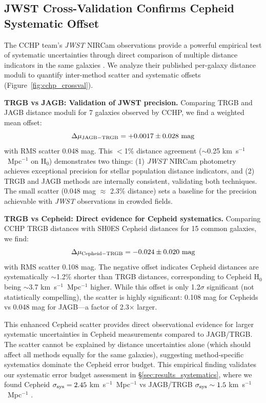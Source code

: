 \documentclass[twocolumn, linenumbers]{aastex701}
\begin{document}
\subsection{JWST Cross-Validation Confirms Cepheid Systematic Offset}
\label{sec:results_jwst}

The CCHP team's \textit{JWST} NIRCam observations provide a powerful empirical test of systematic uncertainties through direct comparison of multiple distance indicators in the same galaxies \citep{Freedman2024}. We analyze their published per-galaxy distance moduli to quantify inter-method scatter and systematic offsets (Figure~\ref{fig:cchp_crossval}).

\textbf{TRGB vs JAGB: Validation of JWST precision.} Comparing TRGB and JAGB distance moduli for 7 galaxies observed by CCHP, we find a weighted mean offset:
\begin{equation}
\Delta\mu_{\rm JAGB-TRGB} = +0.0017 \pm 0.028~{\rm mag}
\end{equation}
with RMS scatter 0.048 mag. This $<$1\% distance agreement ($\sim$0.25 km~s$^{-1}$~Mpc$^{-1}$ on H$_0$) demonstrates two things: (1) \textit{JWST} NIRCam photometry achieves exceptional precision for stellar population distance indicators, and (2) TRGB and JAGB methods are internally consistent, validating both techniques. The small scatter (0.048 mag $\approx$ 2.3\% distance) sets a baseline for the precision achievable with \textit{JWST} observations in crowded fields.

\textbf{TRGB vs Cepheid: Direct evidence for Cepheid systematics.} Comparing CCHP TRGB distances with SH0ES Cepheid distances for 15 common galaxies, we find:
\begin{equation}
\Delta\mu_{\rm Cepheid-TRGB} = -0.024 \pm 0.020~{\rm mag}
\end{equation}
with RMS scatter 0.108 mag. The negative offset indicates Cepheid distances are systematically $\sim$1.2\% shorter than TRGB distances, corresponding to Cepheid H$_0$ being $\sim$3.7 km~s$^{-1}$~Mpc$^{-1}$ higher. While this offset is only 1.2$\sigma$ significant (not statistically compelling), the scatter is highly significant: 0.108 mag for Cepheids vs 0.048 mag for JAGB---a factor of 2.3$\times$ larger.

This enhanced Cepheid scatter provides direct observational evidence for larger systematic uncertainties in Cepheid measurements compared to JAGB/TRGB. The scatter cannot be explained by distance uncertainties alone (which should affect all methods equally for the same galaxies), suggesting method-specific systematics dominate the Cepheid error budget. This empirical finding validates our systematic error budget assessment in \S\ref{sec:results_systematics}, where we found Cepheid $\sigma_{\rm sys} = 2.45$ km~s$^{-1}$~Mpc$^{-1}$ vs JAGB/TRGB $\sigma_{\rm sys} \sim 1.5$ km~s$^{-1}$~Mpc$^{-1}$ \citep{Freedman2024}.
\end{document}
